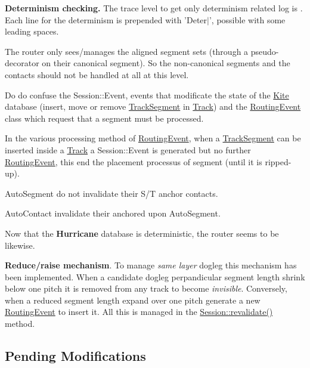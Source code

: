 \begin{DoxyItemize}
\item {\bfseries Determinism checking.} The trace level to get only determinism related log is {}. Each line for the determinism is prepended with 'Deter$|$', possible with some leading spaces.
\item The router only sees/manages the aligned segment sets (through a pseudo-\/ decorator on their canonical segment). So the non-\/canonical segments and the contacts should not be handled at all at this level.
\item Do do confuse the Session\-::\-Event, events that modificate the state of the \hyperlink{namespaceKite}{Kite} database (insert, move or remove \hyperlink{classKite_1_1TrackSegment}{Track\-Segment} in \hyperlink{classKite_1_1Track}{Track}) and the \hyperlink{classKite_1_1RoutingEvent}{Routing\-Event} class which request that a segment must be processed.
\item In the various processing method of \hyperlink{classKite_1_1RoutingEvent}{Routing\-Event}, when a \hyperlink{classKite_1_1TrackSegment}{Track\-Segment} can be inserted inside a \hyperlink{classKite_1_1Track}{Track} a Session\-::\-Event is generated but no further \hyperlink{classKite_1_1RoutingEvent}{Routing\-Event}, this end the placement processus of segment (until it is ripped-\/up).
\item Auto\-Segment do not invalidate their S/\-T anchor contacts.
\item Auto\-Contact invalidate their anchored upon Auto\-Segment.
\item Now that the {\bf Hurricane} database is deterministic, the router seems to be likewise.
\item {\bfseries Reduce/raise mechanism}. To manage {\itshape same layer} dogleg this mechanism has been implemented. When a candidate dogleg perpandicular segment length shrink below one pitch it is removed from any track to become {\itshape invisible}. Conversely, when a reduced segment length expand over one pitch generate a new \hyperlink{classKite_1_1RoutingEvent}{Routing\-Event} to insert it. All this is managed in the \hyperlink{classKite_1_1Session_a5bd93abe1416952ace15a98dbeeed124}{Session\-::revalidate()} method.
\end{DoxyItemize}\hypertarget{pageNotes_secPendingModifications}{}\subsection{Pending Modifications}\label{pageNotes_secPendingModifications}

